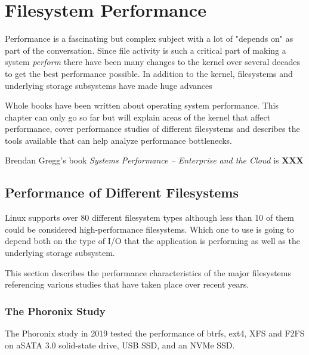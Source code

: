 \chapter{Filesystem Performance}

Performance is a fascinating but complex subject with a lot of "depends on" as part of the conversation. Since file activity is such a critical part of making a system \textit{perform} there have been many changes to the kernel over several decades to get the best performance possible. In addition to the kernel, filesystems and underlying storage subsystems have made huge advances

Whole books have been written about operating system performance. This chapter can only go so far but will explain areas of the kernel that affect performance, cover performance studies of different filesystems and describes the tools available that can help analyze performance bottlenecks.

Brendan Gregg's book \textit{Systems Performance -- Enterprise and the Cloud} \cite{gregg-perf} is \textbf{XXX}


\section{Performance of Different Filesystems}

Linux supports over 80 different filesystem types although less than 10 of them could be considered high-performance filesystems. Which one to use is going to depend both on the type of I/O that the application is performing as well as the underlying storage subsystem.

This section describes the performance characteristics of the major filesystems referencing various studies that have taken place over recent years.

\subsection{The Phoronix Study}

The Phoronix study in 2019 tested the performance of btrfs, ext4, XFS and F2FS on aSATA 3.0 solid-state drive, USB SSD, and an NVMe SSD.


